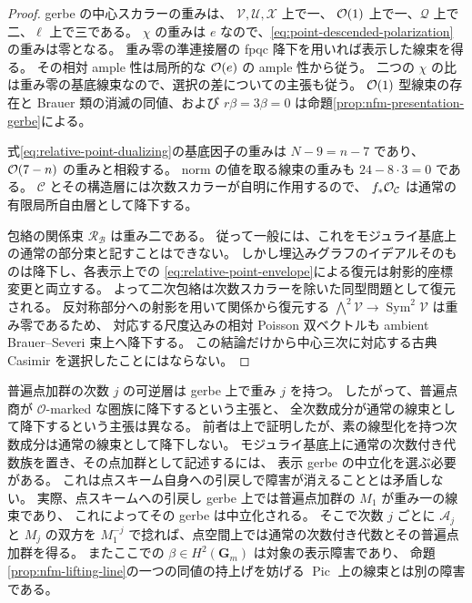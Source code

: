\begin{proof}
gerbe の中心スカラーの重みは、
$\mathcal V,\mathcal U,\mathcal X$ 上で一、
$\mathcal O(1)$ 上で一、$\mathcal Q$ 上で二、$\ell$ 上で三である。
$\chi$ の重みは $e$ なので、\eqref{eq:point-descended-polarization} の重みは零となる。
重み零の準連接層の fpqc 降下を用いれば表示した線束を得る。
その相対 ample 性は局所的な $\mathcal O(e)$ の ample 性から従う。
二つの $\chi$ の比は重み零の基底線束なので、選択の差についての主張も従う。
$\mathcal O(1)$ 型線束の存在と Brauer 類の消滅の同値、および
$r\beta=3\beta=0$ は命題\ref{prop:nfm-presentation-gerbe}による。

式\eqref{eq:relative-point-dualizing}の基底因子の重みは $N-9=n-7$ であり、
$\mathcal O(7-n)$ の重みと相殺する。
norm の値を取る線束の重みも $24-8\cdot3=0$ である。
$\mathcal C$ とその構造層には次数スカラーが自明に作用するので、
$f_*\mathcal O_{\mathcal C}$ は通常の有限局所自由層として降下する。

包絡の関係束 $\mathcal R_{\mathcal B}$ は重み二である。
従って一般には、これをモジュライ基底上の通常の部分束と記すことはできない。
しかし埋込みグラフのイデアルそのものは降下し、各表示上での
\eqref{eq:relative-point-envelope}による復元は射影的座標変更と両立する。
よって二次包絡は次数スカラーを除いた同型問題として復元される。
反対称部分への射影を用いて関係から復元する
$\bigwedge^2\mathcal V\to\operatorname{Sym}^2\mathcal V$ は重み零であるため、
対応する尺度込みの相対 Poisson 双ベクトルも ambient Brauer--Severi 束上へ降下する。
この結論だけから中心三次に対応する古典 Casimir を選択したことにはならない。
\end{proof}

\begin{remark}[普遍点加群と普遍点商]
普遍点加群の次数 $j$ の可逆層は gerbe 上で重み $j$ を持つ。
したがって、普遍点商が $\mathcal O$-marked な圏族に降下するという主張と、
全次数成分が通常の線束として降下するという主張は異なる。
前者は上で証明したが、素の線型化を持つ次数成分は通常の線束として降下しない。
モジュライ基底上に通常の次数付き代数族を置き、その点加群として記述するには、
表示 gerbe の中立化を選ぶ必要がある。
これは点スキーム自身への引戻しで障害が消えることとは矛盾しない。
実際、点スキームへの引戻し gerbe 上では普遍点加群の $M_1$ が重み一の線束であり、
これによってその gerbe は中立化される。
そこで次数 $j$ ごとに $\mathcal A_j$ と $M_j$ の双方を
$M_1^{-j}$ で捻れば、点空間上では通常の次数付き代数とその普遍点加群を得る。
またここでの $\beta\in H^2(\mathbf G_m)$ は対象の表示障害であり、
命題\ref{prop:nfm-lifting-line}の一つの同値の持上げを妨げる
$\operatorname{Pic}$ 上の線束とは別の障害である。
\end{remark}
